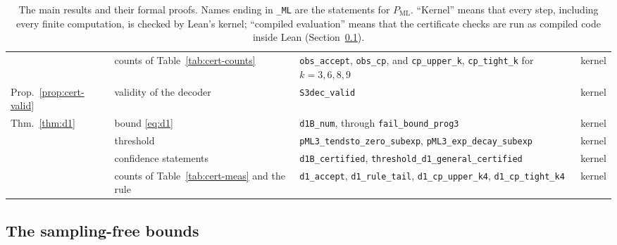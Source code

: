 \documentclass[11pt]{amsart}
\theoremstyle{definition}
\theoremstyle{remark}
\numberwithin{equation}{section}
\newcommand{\PML}{P_{\mathrm{ML}}}
\begin{document}
\begin{table}[t]
\begin{tabular}{@{}p{}>{\raggedright\arraybackslash}p{}>{\raggedright\arraybackslash}p{}l@{}}
 & counts of Table~\ref{tab:cert-counts} & \texttt{obs\_accept}, \texttt{obs\_cp}, and \texttt{cp\_upper\_k}, \texttt{cp\_tight\_k} for $k=3,6,8,9$ & kernel \\
Prop.~\ref{prop:cert-valid} & validity of the decoder & \texttt{S3dec\_valid} & kernel \\
Thm.~\ref{thm:d1} & bound \eqref{eq:d1} & \texttt{d1B\_num}, through \texttt{fail\_bound\_prog3} & kernel \\
 & threshold & \texttt{pML3\_tendsto\_zero\_subexp}, \texttt{pML3\_exp\_decay\_subexp} & kernel \\
 & confidence statements & \texttt{d1B\_certified}, \texttt{threshold\_d1\_general\_certified} & kernel \\
 & counts of Table~\ref{tab:cert-meas} and the rule & \texttt{d1\_accept}, \texttt{d1\_rule\_tail}, \texttt{d1\_cp\_upper\_k4}, \texttt{d1\_cp\_tight\_k4} & kernel \\
\bottomrule
\end{tabular}
\caption{The main results and their formal proofs. Names ending in \texttt{\_ML} are the statements for $\PML$. ``Kernel'' means that every step, including every finite computation, is checked by Lean's kernel; ``compiled evaluation'' means that the certificate checks are run as compiled code inside Lean (Section~\ref{sec:lean-count}).}
\label{tab:results}
\end{table}

\subsection{The sampling-free bounds}\label{sec:lean-count}
\end{document}
